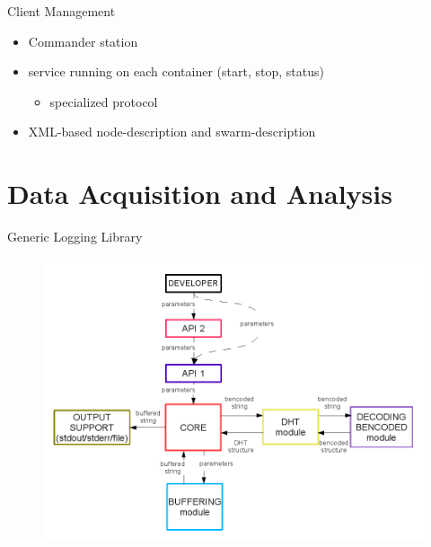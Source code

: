 \documentclass{beamer}
\begin{document}
\begin{frame}{Client Management}
  \begin{itemize}
    \item Commander station
    \item service running on each container (start, stop, status)
      \begin{itemize}
        \item specialized protocol
      \end{itemize}
    \item XML-based node-description and swarm-description
  \end{itemize}
\end{frame}

\section{Data Acquisition and Analysis}

\begin{frame}{Generic Logging Library}
  \begin{figure}
    \includegraphics[scale=0.3]{img/log-library-architecture}
  \end{figure}
\end{frame}
\end{document}
